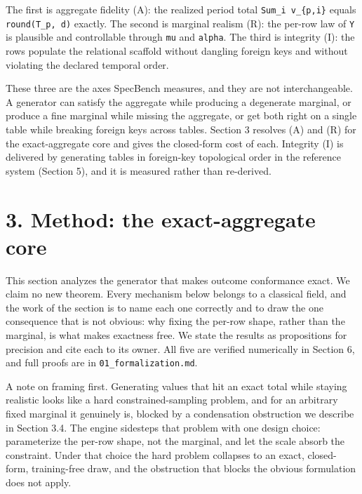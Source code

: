 The first is aggregate fidelity (A): the realized period total
\texttt{Sum\_\allowbreak{}i\ v\_\allowbreak{}\{p,i\}} equals \texttt{round(T\_\allowbreak{}p,\ d)} exactly. The
second is marginal realism (R): the per-row law of \texttt{Y} is
plausible and controllable through \texttt{mu} and \texttt{alpha}. The
third is integrity (I): the rows populate the relational scaffold
without dangling foreign keys and without violating the declared
temporal order.

These three are the axes SpecBench measures, and they are not
interchangeable. A generator can satisfy the aggregate while producing a
degenerate marginal, or produce a fine marginal while missing the
aggregate, or get both right on a single table while breaking foreign
keys across tables. Section 3 resolves (A) and (R) for the
exact-aggregate core and gives the closed-form cost of each. Integrity
(I) is delivered by generating tables in foreign-key topological order
in the reference system (Section 5), and it is measured rather than
re-derived.

\hypertarget{method-the-exact-aggregate-core}{%
\section{3. Method: the exact-aggregate
core}\label{method-the-exact-aggregate-core}}

This section analyzes the generator that makes outcome conformance
exact. We claim no new theorem. Every mechanism below belongs to a
classical field, and the work of the section is to name each one
correctly and to draw the one consequence that is not obvious: why
fixing the per-row shape, rather than the marginal, is what makes
exactness free. We state the results as propositions for precision and
cite each to its owner. All five are verified numerically in Section 6,
and full proofs are in \texttt{01\_\allowbreak{}formalization.md}.

A note on framing first. Generating values that hit an exact total while
staying realistic looks like a hard constrained-sampling problem, and
for an arbitrary fixed marginal it genuinely is, blocked by a
condensation obstruction we describe in Section 3.4. The engine
sidesteps that problem with one design choice: parameterize the per-row
shape, not the marginal, and let the scale absorb the constraint. Under
that choice the hard problem collapses to an exact, closed-form,
training-free draw, and the obstruction that blocks the obvious
formulation does not apply.

